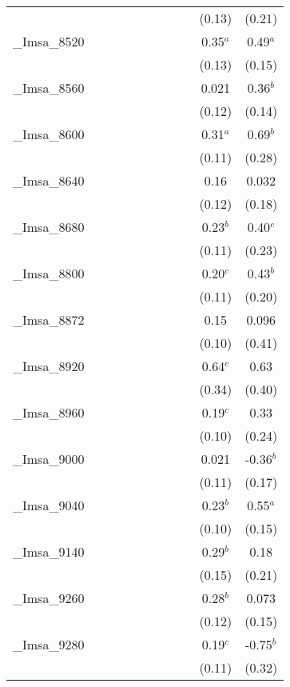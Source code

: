 \documentclass[]{article}
\begin{document}
\begin{tabular}{lcccccccccc}
 &  &  &  &  &  &  &  &  & (0.13) & (0.21) \\
\_Imsa\_8520 &  &  &  &  &  &  &  &  & 0.35$^a$ & 0.49$^a$ \\
 &  &  &  &  &  &  &  &  & (0.13) & (0.15) \\
\_Imsa\_8560 &  &  &  &  &  &  &  &  & 0.021 & 0.36$^b$ \\
 &  &  &  &  &  &  &  &  & (0.12) & (0.14) \\
\_Imsa\_8600 &  &  &  &  &  &  &  &  & 0.31$^a$ & 0.69$^b$ \\
 &  &  &  &  &  &  &  &  & (0.11) & (0.28) \\
\_Imsa\_8640 &  &  &  &  &  &  &  &  & 0.16 & 0.032 \\
 &  &  &  &  &  &  &  &  & (0.12) & (0.18) \\
\_Imsa\_8680 &  &  &  &  &  &  &  &  & 0.23$^b$ & 0.40$^c$ \\
 &  &  &  &  &  &  &  &  & (0.11) & (0.23) \\
\_Imsa\_8800 &  &  &  &  &  &  &  &  & 0.20$^c$ & 0.43$^b$ \\
 &  &  &  &  &  &  &  &  & (0.11) & (0.20) \\
\_Imsa\_8872 &  &  &  &  &  &  &  &  & 0.15 & 0.096 \\
 &  &  &  &  &  &  &  &  & (0.10) & (0.41) \\
\_Imsa\_8920 &  &  &  &  &  &  &  &  & 0.64$^c$ & 0.63 \\
 &  &  &  &  &  &  &  &  & (0.34) & (0.40) \\
\_Imsa\_8960 &  &  &  &  &  &  &  &  & 0.19$^c$ & 0.33 \\
 &  &  &  &  &  &  &  &  & (0.10) & (0.24) \\
\_Imsa\_9000 &  &  &  &  &  &  &  &  & 0.021 & -0.36$^b$ \\
 &  &  &  &  &  &  &  &  & (0.11) & (0.17) \\
\_Imsa\_9040 &  &  &  &  &  &  &  &  & 0.23$^b$ & 0.55$^a$ \\
 &  &  &  &  &  &  &  &  & (0.10) & (0.15) \\
\_Imsa\_9140 &  &  &  &  &  &  &  &  & 0.29$^b$ & 0.18 \\
 &  &  &  &  &  &  &  &  & (0.15) & (0.21) \\
\_Imsa\_9260 &  &  &  &  &  &  &  &  & 0.28$^b$ & 0.073 \\
 &  &  &  &  &  &  &  &  & (0.12) & (0.15) \\
\_Imsa\_9280 &  &  &  &  &  &  &  &  & 0.19$^c$ & -0.75$^b$ \\
 &  &  &  &  &  &  &  &  & (0.11) & (0.32) \\

\end{tabular}
\end{document}
